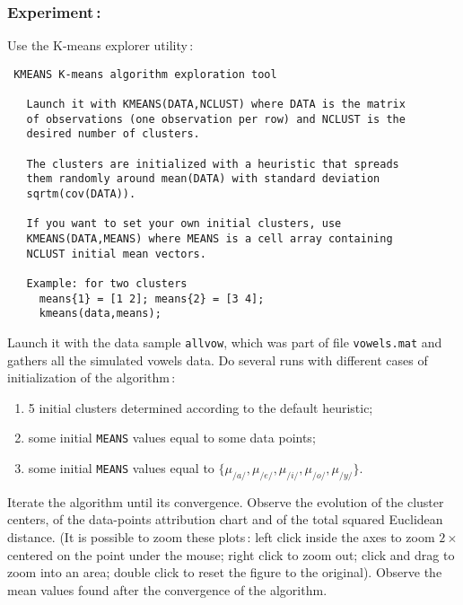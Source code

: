 \documentclass[twoside,a4paper,titlepage]{article}
\newcommand{\com}[1]{{\tt #1}}
\begin{document}



\subsubsection*{Experiment\,:}
Use the K-means explorer utility\,:
\begin{verbatim}
 KMEANS K-means algorithm exploration tool

   Launch it with KMEANS(DATA,NCLUST) where DATA is the matrix
   of observations (one observation per row) and NCLUST is the
   desired number of clusters.

   The clusters are initialized with a heuristic that spreads
   them randomly around mean(DATA) with standard deviation
   sqrtm(cov(DATA)).

   If you want to set your own initial clusters, use
   KMEANS(DATA,MEANS) where MEANS is a cell array containing
   NCLUST initial mean vectors.

   Example: for two clusters
     means{1} = [1 2]; means{2} = [3 4];
     kmeans(data,means);

\end{verbatim}

\pagebreak
Launch it with the data sample \com{allvow}, which was part of file
\com{vowels.mat} and gathers all the simulated vowels data. Do several runs
with different cases of initialization of the algorithm\,:
\begin{enumerate}
\item 5 initial clusters determined according to the default heuristic;
\item some initial \com{MEANS} values equal to some data points;
\item some initial \com{MEANS} values equal to $\{\mu_{/a/}, \mu_{/e/},
\mu_{/i/}, \mu_{/o/}, \mu_{/y/}\}$.
\end{enumerate}
Iterate the algorithm until its convergence. Observe the evolution of the
cluster centers, of the data-points attribution chart and of the total
squared Euclidean distance. (It is possible to zoom these plots\,: left
click inside the axes to zoom $2\times$ centered on the point under the
mouse; right click to zoom out; click and drag to zoom into an area; double
click to reset the figure to the original). %
Observe the mean values found after the convergence of the algorithm.
\end{document}
